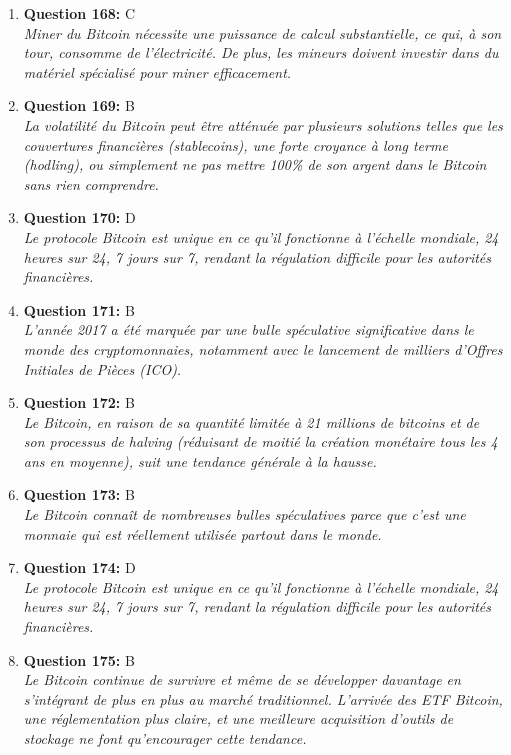 \documentclass[12pt,a4paper]{article}
\begin{document}
\begin{enumerate}
\item \textbf{Question 168:} C
\\ \textit{Miner du Bitcoin nécessite une puissance de calcul substantielle, ce qui, à son tour, consomme de l'électricité. De plus, les mineurs doivent investir dans du matériel spécialisé pour miner efficacement.}

\item \textbf{Question 169:} B
\\ \textit{La volatilité du Bitcoin peut être atténuée par plusieurs solutions telles que les couvertures financières (stablecoins), une forte croyance à long terme (hodling), ou simplement ne pas mettre 100\% de son argent dans le Bitcoin sans rien comprendre.}

\item \textbf{Question 170:} D
\\ \textit{Le protocole Bitcoin est unique en ce qu'il fonctionne à l'échelle mondiale, 24 heures sur 24, 7 jours sur 7, rendant la régulation difficile pour les autorités financières.}

\item \textbf{Question 171:} B
\\ \textit{L'année 2017 a été marquée par une bulle spéculative significative dans le monde des cryptomonnaies, notamment avec le lancement de milliers d'Offres Initiales de Pièces (ICO).}

\item \textbf{Question 172:} B
\\ \textit{Le Bitcoin, en raison de sa quantité limitée à 21 millions de bitcoins et de son processus de halving (réduisant de moitié la création monétaire tous les 4 ans en moyenne), suit une tendance générale à la hausse.}

\item \textbf{Question 173:} B
\\ \textit{Le Bitcoin connaît de nombreuses bulles spéculatives parce que c'est une monnaie qui est réellement utilisée partout dans le monde.}

\item \textbf{Question 174:} D
\\ \textit{Le protocole Bitcoin est unique en ce qu'il fonctionne à l'échelle mondiale, 24 heures sur 24, 7 jours sur 7, rendant la régulation difficile pour les autorités financières.}

\item \textbf{Question 175:} B
\\ \textit{Le Bitcoin continue de survivre et même de se développer davantage en s'intégrant de plus en plus au marché traditionnel. L'arrivée des ETF Bitcoin, une réglementation plus claire, et une meilleure acquisition d'outils de stockage ne font qu'encourager cette tendance.}


\end{enumerate}
\end{document}
